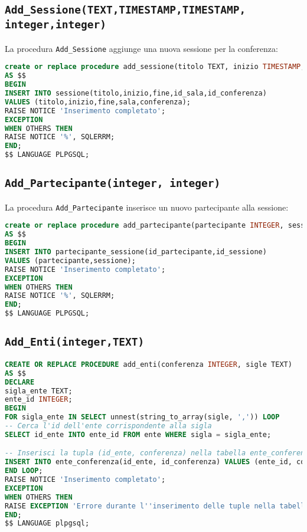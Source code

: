 \subsection{\texttt{Add\_Sessione(TEXT,TIMESTAMP,TIMESTAMP, integer,integer)}}
La procedura \texttt{Add\_Sessione} aggiunge una nuova sessione per la conferenza:
\begin{lstlisting}[language=SQL, style=mystyle]
create or replace procedure add_sessione(titolo TEXT, inizio TIMESTAMP, fine TIMESTAMP, sala INTEGER, conferenza INTEGER)
AS $$
BEGIN
INSERT INTO sessione(titolo,inizio,fine,id_sala,id_conferenza)
VALUES (titolo,inizio,fine,sala,conferenza);
RAISE NOTICE 'Inserimento completato';
EXCEPTION
WHEN OTHERS THEN
RAISE NOTICE '%', SQLERRM;
END;
$$ LANGUAGE PLPGSQL;
\end{lstlisting}
\subsection{\texttt{Add\_Partecipante(integer, integer)}}
La procedura \texttt{Add\_Partecipante} inserisce un nuovo partecipante alla sessione:
\begin{lstlisting}[language=SQL, style=mystyle]
create or replace procedure add_partecipante(partecipante INTEGER, sessione INTEGER)
AS $$
BEGIN
INSERT INTO partecipante_sessione(id_partecipante,id_sessione)
VALUES (partecipante,sessione);
RAISE NOTICE 'Inserimento completato';
EXCEPTION
WHEN OTHERS THEN
RAISE NOTICE '%', SQLERRM;
END;
$$ LANGUAGE PLPGSQL;
\end{lstlisting}
\subsection{\texttt{Add\_Enti(integer,TEXT)}}
\begin{lstlisting}[language=SQL,style=mystyle]
CREATE OR REPLACE PROCEDURE add_enti(conferenza INTEGER, sigle TEXT)
AS $$
DECLARE
sigla_ente TEXT;
ente_id INTEGER;
BEGIN
FOR sigla_ente IN SELECT unnest(string_to_array(sigle, ',')) LOOP
-- Cerca l'id dell'ente corrispondente alla sigla
SELECT id_ente INTO ente_id FROM ente WHERE sigla = sigla_ente;

-- Inserisci la tupla (id_ente, conferenza) nella tabella ente_conferenza
INSERT INTO ente_conferenza(id_ente, id_conferenza) VALUES (ente_id, conferenza);
END LOOP;
RAISE NOTICE 'Inserimento completato';
EXCEPTION
WHEN OTHERS THEN
RAISE EXCEPTION 'Errore durante l''inserimento delle tuple nella tabella ente_conferenza: %', SQLERRM;
END;
$$ LANGUAGE plpgsql;
\end{lstlisting}
